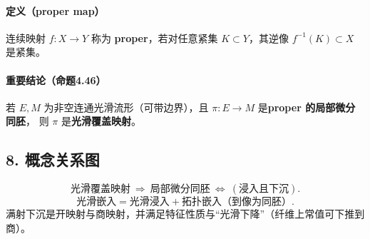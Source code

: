 \documentclass[12pt]{article}
\begin{document}
\paragraph{定义（proper map）}
连续映射 $f:X\to Y$ 称为 \textbf{proper}，若对任意紧集 $K\subset Y$，其逆像 $f^{-1}(K)\subset X$ 是紧集。

\paragraph{重要结论（命题4.46）}
若 $E,M$ 为非空连通光滑流形（可带边界），且 $\pi:E\to M$ 是\textbf{proper 的局部微分同胚}，
则 $\pi$ 是\textbf{光滑覆盖映射}。

\subsection*{8. 概念关系图}
\[
\text{光滑覆盖映射}\ \Rightarrow\ \text{局部微分同胚}\ \Longleftrightarrow\ (\text{浸入且下沉}).
\]
\[
\text{光滑嵌入}=\text{光滑浸入}+\text{拓扑嵌入（到像为同胚）}.
\]
满射下沉是开映射与商映射，并满足特征性质与“光滑下降”（纤维上常值可下推到商）。
\end{document}
